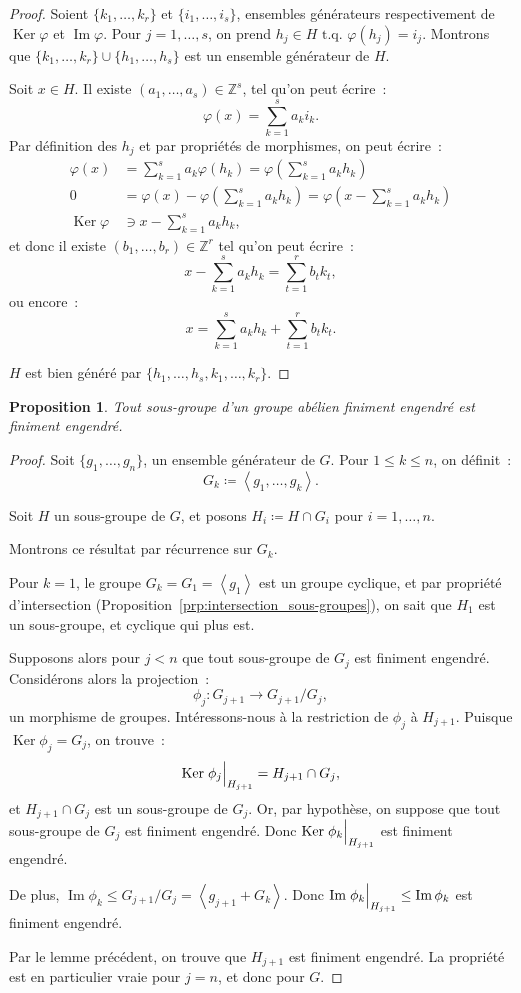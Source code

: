 \documentclass{article}
\newtheorem{prp}[thm]{Proposition}
\theoremstyle{definition}
\theoremstyle{remark}
\DeclareMathOperator{\Imf}{Im}
\DeclareMathOperator{\Ker}{Ker}
\newcommand{\Z}{\mathbb Z}
\newcommand{\tq}{\text{ t.q. }}
\newcommand{\eng}[1]{\left\langle#1\right\rangle}
\newcommand{\restr}[2]{\left.#1\vphantom{\big|}\right|_{#2}}
\begin{document}
	\begin{proof} Soient $\{k_1, \ldots, k_r\}$ et $\{i_1, \ldots, i_s\}$, ensembles générateurs respectivement de $\Ker \varphi$ et $\Imf \varphi$.
	Pour $j = 1, \ldots, s$, on prend $h_j \in H \tq \varphi(h_j) = i_j$. Montrons que $\{k_1, \ldots, k_r\} \cup \{h_1, \ldots, h_s\}$ est un ensemble
	générateur de $H$.

	Soit $x \in H$. Il existe $(a_1, \ldots, a_s) \in \Z^s$, tel qu'on peut écrire~:
	\[\varphi(x) = \sum_{k=1}^sa_ki_k.\]
	Par définition des $h_j$ et par propriétés de morphismes, on peut écrire~:
	\begin{align*}
		\varphi(x) &= \sum_{k=1}^sa_k\varphi(h_k) = \varphi\left(\sum_{k=1}^sa_kh_k\right) \\
		0 &= \varphi(x) - \varphi\left(\sum_{k=1}^sa_kh_k\right) = \varphi\left(x - \sum_{k=1}^sa_kh_k\right) \\
		\Ker \varphi &\ni x - \sum_{k=1}^sa_kh_k,
	\end{align*}
	et donc il existe $(b_1, \ldots, b_r) \in \Z^r$ tel qu'on peut écrire~:
	\[x - \sum_{k=1}^sa_kh_k = \sum_{t=1}^rb_tk_t,\]
	ou encore~:
	\[x = \sum_{k=1}^sa_kh_k + \sum_{t=1}^rb_tk_t.\]

	$H$ est bien généré par $\{h_1, \ldots, h_s, k_1, \ldots, k_r\}$.
	\end{proof}

	\begin{prp} Tout sous-groupe d'un groupe abélien finiment engendré est finiment engendré.
	\end{prp}

	\begin{proof} Soit $\{g_1, \ldots, g_n\}$, un ensemble générateur de $G$. Pour $1 \leq k \leq n$, on définit~:
	\[G_k \coloneqq \eng{g_1, \ldots, g_k}.\]

	Soit $H$ un sous-groupe de $G$, et posons $H_i \coloneqq H \cap G_i$ pour $i = 1, \ldots, n$.

	Montrons ce résultat par récurrence sur $G_k$.

	Pour $k=1$, le groupe $G_k = G_1 = \eng {g_1}$ est un groupe cyclique, et par propriété d'intersection (Proposition~\ref{prp:intersection_sous-groupes}), on
	sait que $H_1$ est un sous-groupe, et cyclique qui plus est.

	Supposons alors pour $j < n$ que tout sous-groupe de $G_j$ est finiment engendré. Considérons alors la projection~:
	\[\phi_j : G_{j+1} \to G_{j+1}/G_j,\]
	un morphisme de groupes. Intéressons-nous à la restriction de $\phi_j$ à $H_{j+1}$. Puisque $\Ker \phi_j = G_j$, on trouve~:
	\[\Ker \restr {\phi_j}{H_{j+1}} = H_{j+1} \cap G_j,\]
	et $H_{j+1} \cap G_j$ est un sous-groupe de $G_j$. Or, par hypothèse, on suppose que tout sous-groupe de $G_j$ est finiment engendré. Donc
	$\Ker \restr {\phi_k}{H_{j+1}}$ est finiment engendré.

	De plus, $\Imf \phi_k \leq G_{j+1}/G_j = \eng {g_{j+1}+G_k}$. Donc $\Imf \restr {\phi_k}{H_{j+1}} \leq \Imf \phi_k$ est finiment engendré.

	Par le lemme précédent, on trouve que $H_{j+1}$ est finiment engendré. La propriété est en particulier vraie pour $j=n$, et donc pour $G$.
	\end{proof}
\end{document}
